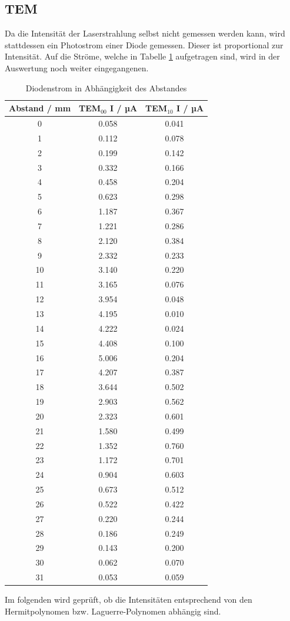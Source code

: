 \subsection{TEM}
Da die Intensität der Laserstrahlung selbst nicht gemessen werden kann, wird stattdessen ein Photostrom einer Diode gemessen. Dieser ist proportional zur Intensität. Auf die Ströme, welche in Tabelle \ref{tab:tem} aufgetragen sind, wird in der Auswertung noch weiter eingegangenen.
\begin{table}
  \centering
  \begin{tabular}{c|c c}
     \toprule
     Abstand / mm & TEM$_{00}$ I / µA & TEM$_{10}$ I / µA \\
     \midrule
     0		& 0.058		& 0.041	\\
     1		& 0.112		& 0.078	\\
     2		& 0.199		& 0.142	\\
     3		& 0.332		& 0.166	\\
     4		& 0.458		& 0.204	\\
     5		& 0.623		& 0.298	\\
     6		& 1.187		& 0.367	\\
     7		& 1.221		& 0.286	\\
     8		& 2.120		& 0.384	\\
     9		& 2.332		& 0.233	\\
     10		& 3.140		& 0.220	\\
     11		& 3.165		& 0.076	\\
     12		& 3.954		& 0.048	\\
     13		& 4.195		& 0.010	\\
     14		& 4.222		& 0.024	\\
     15		& 4.408		& 0.100	\\
     16		& 5.006		& 0.204	\\
     17		& 4.207		& 0.387	\\
     18		& 3.644		& 0.502	\\
     19		& 2.903		& 0.562	\\
     20		& 2.323		& 0.601	\\
     21		& 1.580		& 0.499	\\
     22		& 1.352		& 0.760	\\
     23		& 1.172		& 0.701	\\
     24		& 0.904		& 0.603	\\
     25		& 0.673		& 0.512	\\
     26		& 0.522		& 0.422	\\
     27		& 0.220		& 0.244	\\
     28		& 0.186		& 0.249	\\
     29		& 0.143		& 0.200	\\
     30		& 0.062		& 0.070	\\
     31		& 0.053		& 0.059	\\
     \bottomrule
  \end{tabular}
  \caption{Diodenstrom in Abhängigkeit des Abstandes}
  \label{tab:tem}
\end{table}
Im folgenden wird geprüft, ob die Intensitäten entsprechend von den Hermitpolynomen bzw. Laguerre-Polynomen abhängig sind.

